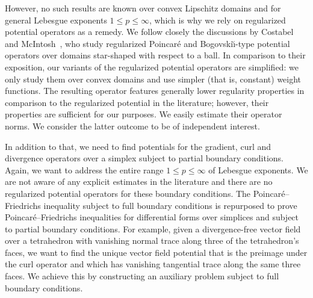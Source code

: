 \documentclass[10pt,letterpaper]{article}
\newcommand{\todo}[1]{\textcolor{red}{TODO: #1}}
\begin{document}
However, no such results are known over convex Lipschitz domains and for general Lebesgue exponents $1 \leq p \leq \infty$, which is why we rely on regularized potential operators as a remedy. %
We follow closely the discussions by Costabel and McIntosh~\cite{costabel2010bogovskiui},
who study regularized Poincar\'e and Bogovski\u{\i}-type potential operators over domains star-shaped with respect to a ball. 
In comparison to their exposition, our variants of the regularized potential operators are simplified:
we only study them over convex domains and use simpler (that is, constant) weight functions. 
The resulting operator features generally lower regularity properties in comparison to the regularized potential in the literature;
however, their properties are sufficient for our purposes. We easily estimate their operator norms. 
We consider the latter outcome to be of independent interest. 


In addition to that, we need to find potentials for the gradient, curl and divergence operators over a simplex subject to partial boundary conditions. 
Again, we want to address the entire range $1 \leq p \leq \infty$ of Lebesgue exponents. 
We are not aware of any explicit estimates in the literature and there are no regularized potential operators for these boundary conditions. 
The Poincar\'e--Friedrichs inequality subject to full boundary conditions is repurposed to prove Poincar\'e--Friedrichs inequalities for differential forms over simplices and subject to partial boundary conditions. 
For example, given a divergence-free vector field over a tetrahedron with vanishing normal trace along three of the tetrahedron's faces, 
we want to find the unique vector field potential that is the preimage under the curl operator and which has vanishing tangential trace along the same three faces. 
We achieve this by constructing an auxiliary problem subject to full boundary conditions.
\\
\end{document}
